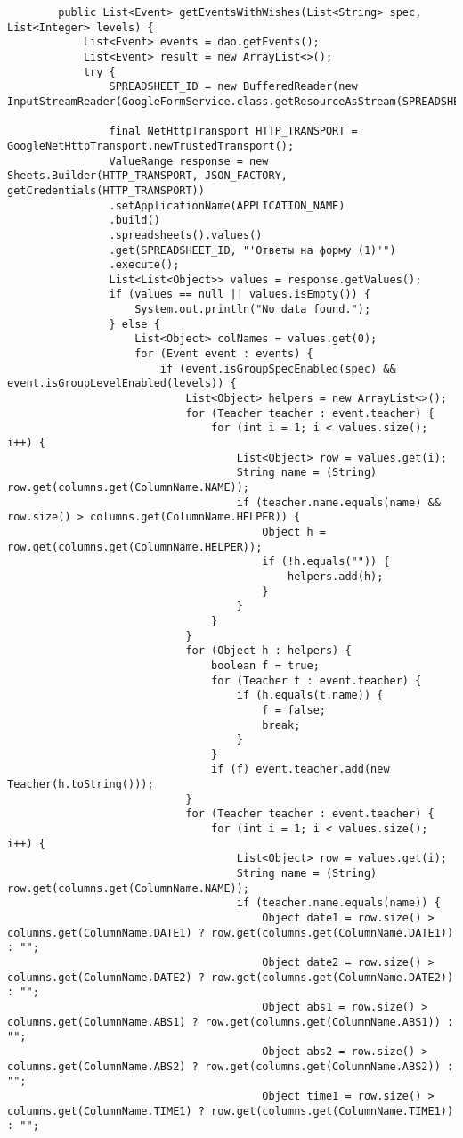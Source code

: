 \begin{lstlisting}
		public List<Event> getEventsWithWishes(List<String> spec, List<Integer> levels) {
			List<Event> events = dao.getEvents();
			List<Event> result = new ArrayList<>();
			try {
				SPREADSHEET_ID = new BufferedReader(new InputStreamReader(GoogleFormService.class.getResourceAsStream(SPREADSHEET_ID_PATH))).readLine();
				
				final NetHttpTransport HTTP_TRANSPORT = GoogleNetHttpTransport.newTrustedTransport();
				ValueRange response = new Sheets.Builder(HTTP_TRANSPORT, JSON_FACTORY, getCredentials(HTTP_TRANSPORT))
				.setApplicationName(APPLICATION_NAME)
				.build()
				.spreadsheets().values()
				.get(SPREADSHEET_ID, "'Ответы на форму (1)'")
				.execute();
				List<List<Object>> values = response.getValues();
				if (values == null || values.isEmpty()) {
					System.out.println("No data found.");
				} else {
					List<Object> colNames = values.get(0);
					for (Event event : events) {
						if (event.isGroupSpecEnabled(spec) && event.isGroupLevelEnabled(levels)) {
							List<Object> helpers = new ArrayList<>();
							for (Teacher teacher : event.teacher) {
								for (int i = 1; i < values.size(); i++) {
									List<Object> row = values.get(i);
									String name = (String) row.get(columns.get(ColumnName.NAME));
									if (teacher.name.equals(name) && row.size() > columns.get(ColumnName.HELPER)) {
										Object h = row.get(columns.get(ColumnName.HELPER));
										if (!h.equals("")) {
											helpers.add(h);
										}
									}
								}
							}
							for (Object h : helpers) {
								boolean f = true;
								for (Teacher t : event.teacher) {
									if (h.equals(t.name)) {
										f = false;
										break;
									}
								}
								if (f) event.teacher.add(new Teacher(h.toString()));
							}
							for (Teacher teacher : event.teacher) {
								for (int i = 1; i < values.size(); i++) {
									List<Object> row = values.get(i);
									String name = (String) row.get(columns.get(ColumnName.NAME));
									if (teacher.name.equals(name)) {
										Object date1 = row.size() > columns.get(ColumnName.DATE1) ? row.get(columns.get(ColumnName.DATE1)) : "";
										Object date2 = row.size() > columns.get(ColumnName.DATE2) ? row.get(columns.get(ColumnName.DATE2)) : "";
										Object abs1 = row.size() > columns.get(ColumnName.ABS1) ? row.get(columns.get(ColumnName.ABS1)) : "";
										Object abs2 = row.size() > columns.get(ColumnName.ABS2) ? row.get(columns.get(ColumnName.ABS2)) : "";
										Object time1 = row.size() > columns.get(ColumnName.TIME1) ? row.get(columns.get(ColumnName.TIME1)) : "";

\end{lstlisting}
